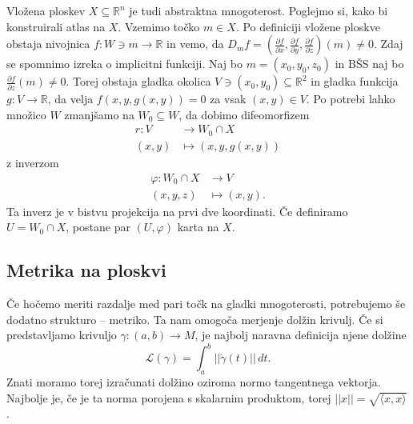 \documentclass[10pt, a4paper]{article}
\begin{document}
Vložena ploskev $X \subseteq  \mathbb{R}^n$ je tudi abstraktna mnogoterost. Poglejmo si, kako bi konstruirali atlas na $X$. Vzemimo točko $m \in  X$. Po definiciji vložene ploskve obstaja nivojnica $f: W \ni m \to \mathbb{R}$ in vemo, da $D_mf = \left( \frac{ \partial f }{ \partial x } , \frac{ \partial f }{ \partial y }  , \frac{ \partial f }{ \partial z }  \right)\left( m \right) \neq 0$. Zdaj se spomnimo izreka o implicitni funkciji. Naj bo $m = \left( x_0, y_0 , z_0 \right)$ in BŠS naj bo $\frac{ \partial f }{ \partial z }\left( m \right) \neq 0$. Torej obstaja gladka okolica $V \ni \left( x_0, y_0 \right) \subseteq  \mathbb{R}^2$  in gladka funkcija $g: V \to \mathbb{R}$, da velja $f\left( x, y, g\left( x,y \right) \right) = 0$  za vsak $\left( x,y \right) \in  V$. Po potrebi lahko množico $W$ zmanjšamo na $W_0 \subseteq  W$, da dobimo difeomorfizem \begin{align*}
	r: V &\longrightarrow W_0 \cap  X \\
	\left( x,y \right) &\longmapsto \left( x,y,g\left( x,y \right) \right)
\end{align*} z inverzom \begin{align*}
	\varphi: W_0 \cap  X &\longrightarrow V \\
	\left( x,y,z \right) &\longmapsto \left( x,y \right).
\end{align*}Ta inverz je v bistvu projekcija na prvi dve koordinati. Če definiramo $U = W_0 \cap  X$, postane par $\left( U, \varphi \right)$  karta na $X$.  

\subsection{Metrika na ploskvi}%

Če hočemo meriti razdalje med pari točk na gladki mnogoterosti, potrebujemo še dodatno strukturo -- metriko. Ta nam omogoča merjenje dolžin krivulj. Če si predstavljamo krivuljo $\gamma : \left( a,b \right) \to M$, je najbolj naravna definicija njene dolžine \[
\mathcal{L}\left( \gamma \right) = \int_{a}^{b} \lvert\lvert \dot{\gamma } \left( t \right) \rvert\rvert  \, dt. 
\]Znati moramo torej izračunati dolžino oziroma normo tangentnega vektorja. Najbolje je, če je ta norma porojena s skalarnim produktom, torej $\lvert\lvert x \rvert\rvert = \sqrt{\langle x,x \rangle } $.
\end{document}
